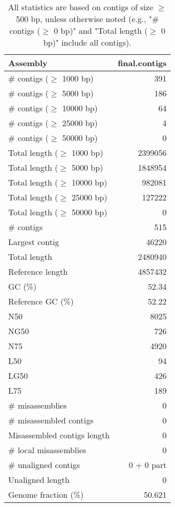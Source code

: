 \documentclass[12pt,a4paper]{article}
\begin{document}
\begin{table}[ht]
\begin{center}
\caption{All statistics are based on contigs of size $\geq$ 500 bp, unless otherwise noted (e.g., "\# contigs ($\geq$ 0 bp)" and "Total length ($\geq$ 0 bp)" include all contigs).}
\begin{tabular}{|l*{1}{|r}|}
\hline
Assembly & final.contigs \\ \hline
\# contigs ($\geq$ 1000 bp) & 391 \\ \hline
\# contigs ($\geq$ 5000 bp) & 186 \\ \hline
\# contigs ($\geq$ 10000 bp) & 64 \\ \hline
\# contigs ($\geq$ 25000 bp) & 4 \\ \hline
\# contigs ($\geq$ 50000 bp) & 0 \\ \hline
Total length ($\geq$ 1000 bp) & 2399056 \\ \hline
Total length ($\geq$ 5000 bp) & 1848954 \\ \hline
Total length ($\geq$ 10000 bp) & 982081 \\ \hline
Total length ($\geq$ 25000 bp) & 127222 \\ \hline
Total length ($\geq$ 50000 bp) & 0 \\ \hline
\# contigs & 515 \\ \hline
Largest contig & 46220 \\ \hline
Total length & 2480940 \\ \hline
Reference length & 4857432 \\ \hline
GC (\%) & 52.34 \\ \hline
Reference GC (\%) & 52.22 \\ \hline
N50 & 8025 \\ \hline
NG50 & 726 \\ \hline
N75 & 4920 \\ \hline
L50 & 94 \\ \hline
LG50 & 426 \\ \hline
L75 & 189 \\ \hline
\# misassemblies & 0 \\ \hline
\# misassembled contigs & 0 \\ \hline
Misassembled contigs length & 0 \\ \hline
\# local misassemblies & 0 \\ \hline
\# unaligned contigs & 0 + 0 part \\ \hline
Unaligned length & 0 \\ \hline
Genome fraction (\%) & 50.621 \\ \hline

\end{tabular}
\end{center}
\end{table}
\end{document}
